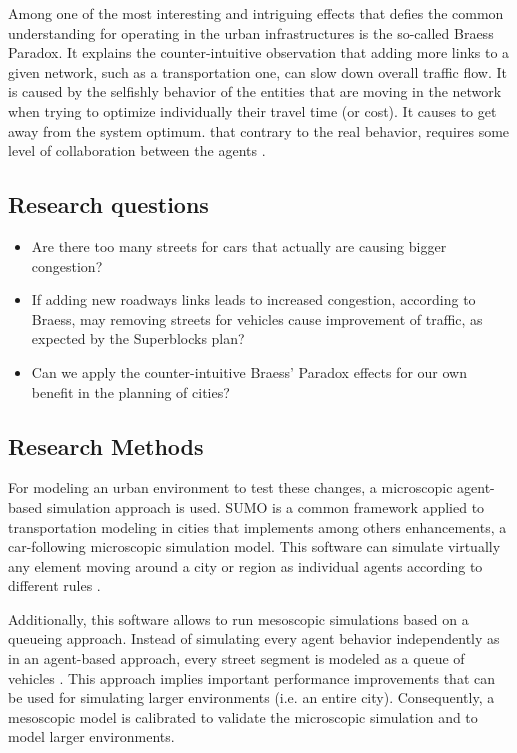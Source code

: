 \documentclass[11pt]{article}
\begin{document}
Among one of the most interesting and intriguing effects that defies the common understanding for operating in the urban infrastructures is the so-called Braess Paradox. It explains the counter-intuitive observation that adding more links to a given network, such as a transportation one, can slow down overall traffic flow. It is caused by the selfishly behavior of the entities that are moving in the network when trying to optimize individually their travel time (or cost). It causes to get away from the system optimum. that contrary to the real behavior, requires some level of collaboration between the agents \citep{Braess1969}.

\subsection {Research questions}

\begin{itemize}
\setlength\itemsep{0.05em}
    \item Are there too many streets for cars that actually are causing bigger congestion?
    \item If adding new roadways links leads to increased congestion, according to Braess, may removing streets for vehicles cause improvement of traffic, as expected by the Superblocks plan?
    \item Can we apply the counter-intuitive Braess’ Paradox effects for our own benefit in the planning of cities?
\end{itemize}

\subsection {Research Methods}

For modeling an urban environment to test these changes, a microscopic agent-based simulation approach is used. SUMO is a common framework applied to transportation modeling in cities that implements among others enhancements, a car-following microscopic simulation model. This software can simulate virtually any element moving around a city or region as individual agents according to different rules \citep{Lopez2018}.

Additionally, this software allows to run mesoscopic simulations based on a queueing approach. Instead of simulating every agent behavior independently as in an agent-based approach, every street segment is modeled as a queue of vehicles \citep{Eissfeldt2004}. This approach implies important performance improvements that can be used for simulating larger environments (i.e. an entire city). Consequently, a mesoscopic model is calibrated to validate the microscopic simulation and to model larger environments. 
\end{document}
